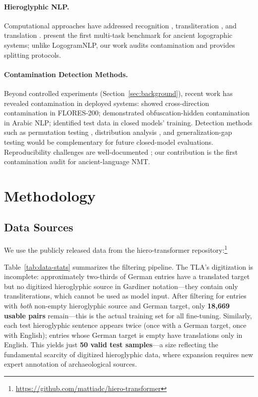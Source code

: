 \documentclass[11pt,a4paper]{article}
\begin{document}
\paragraph{Hieroglyphic NLP.}
Computational approaches have addressed recognition \citep{franken2013automatic, barucci2021deep}, transliteration \citep{wiesenbach2019multi}, and translation \citep{decao2024deep}. \citet{chen2024logogramnlp} present the first multi-task benchmark for ancient logographic systems; unlike LogogramNLP, our work audits contamination and provides splitting protocols.

\paragraph{Contamination Detection Methods.}
Beyond controlled experiments (Section~\ref{sec:background}), recent work has revealed contamination in deployed systems: \citet{tan2026flores} showed cross-direction contamination in FLORES-200; \citet{abbas2026obscuring} demonstrated obfuscation-hidden contamination in Arabic NLP; \citet{enis2024llm2nmt} identified test data in closed models' training. Detection methods such as permutation testing \citep{oren2023proving}, distribution analysis \citep{dong2024generalization}, and generalization-gap testing \citep{dekoninck2024constat} would be complementary for future closed-model evaluations. Reproducibility challenges are well-documented \citep{pineau2021improving, sommerschield2023machine}; our contribution is the first contamination audit for ancient-language NMT.

\section{Methodology}
\label{sec:methodology}

\subsection{Data Sources}
\label{sec:method-data}

We use the publicly released data from the hiero-transformer repository:\footnote{\url{https://github.com/mattiadc/hiero-transformer}}

Table~\ref{tab:data-stats} summarizes the filtering pipeline.
The TLA's digitization is incomplete: approximately two-thirds of German entries have a translated target but no digitized hieroglyphic source in Gardiner notation---they contain only transliterations, which cannot be used as model input. After filtering for entries with \emph{both} non-empty hieroglyphic source and German target, only \textbf{18,669 usable pairs} remain---this is the actual training set for all fine-tuning. Similarly, each test hieroglyphic sentence appears twice (once with a German target, once with English); entries whose German target is empty have translations only in English. This yields just \textbf{50 valid test samples}---a size reflecting the fundamental scarcity of digitized hieroglyphic data, where expansion requires new expert annotation of archaeological sources.
\end{document}
